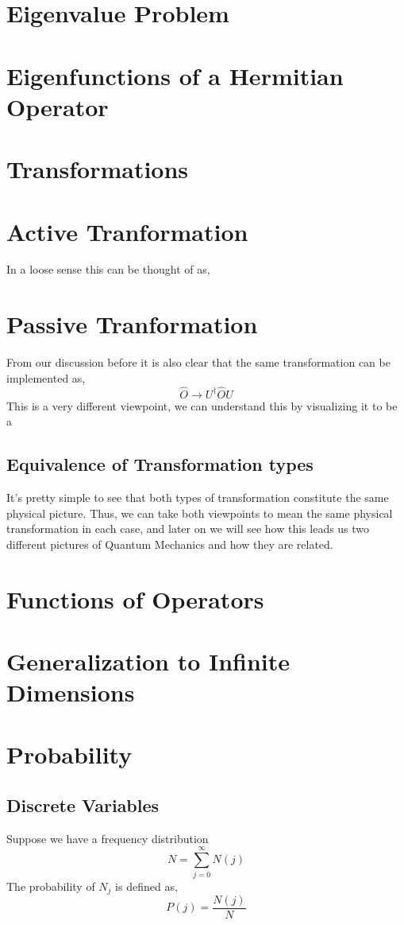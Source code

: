 \section{Eigenvalue Problem}
\section{Eigenfunctions of a Hermitian Operator}
\section{Transformations}
\section{Active Tranformation}
In a loose sense this can be thought of as,

\section{Passive Tranformation}
From our discussion before it is also clear that the same transformation can be implemented as,
\begin{equation}
\hat{O} \rightarrow U^{\dagger}\hat{O}U
\end{equation}
This is a very different viewpoint, we can understand this by visualizing it to be a 
\subsection{Equivalence of Transformation types}
It's pretty simple to see that both types of transformation constitute the same physical picture. Thus, we can take both viewpoints to mean the same physical transformation in each case, and later on we will see how this leads us two different pictures of Quantum Mechanics and how they are related.
\section{Functions of Operators}
\section{Generalization to Infinite Dimensions}
\section{Probability}
\subsection{Discrete Variables}
Suppose we have a frequency distribution 
\begin{equation}
N = \sum_{j=0}^{\infty} N(j)
\end{equation}
The probability of $N_{j}$ is defined as,
\begin{equation}
P(j) = \frac{N(j)}{N}
\end{equation}
